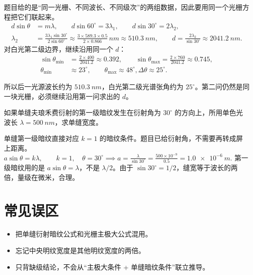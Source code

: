\documentclass[lang=cn,11pt]{elegantbook}
\begin{document}
\begin{solution}
题目给的是“同一光栅、不同波长、不同级次”的两组数据，因此要用同一个光栅方程把它们联起来。
\[
\begin{aligned}
d\sin\theta&=m\lambda,\qquad
d\sin60^\circ=3\lambda_1,\qquad
d\sin30^\circ=2\lambda_2,\\
\lambda_2&=\frac{3\lambda_1\sin30^\circ}{2\sin60^\circ}
\approx \frac{3\times589.3\times0.5}{2\times0.866}\,\si{nm}
\approx \SI{510.3}{nm},\qquad
d=\frac{2\lambda_2}{\sin30^\circ}\approx \SI{2041.2}{nm}.
\end{aligned}
\]
对白光第二级边界，继续沿用同一个 \(d\)：
\[
\begin{aligned}
\sin\theta_{\min}&=\frac{2\times400}{2041.2}\approx0.392,\qquad
\sin\theta_{\max}=\frac{2\times760}{2041.2}\approx0.745,\\
\theta_{\min}&\approx23^\circ,\qquad
\theta_{\max}\approx48^\circ,
\Delta\theta\approx25^\circ.
\end{aligned}
\]

所以后一光源波长约为 \(\SI{510.3}{nm}\)，白光第二级光谱张角约为 \(25^\circ\)。第二问仍然是同一块光栅，必须继续沿用第一问求出的 \(d\)。
\end{solution}

\begin{exercise}
如果单缝夫琅禾费衍射的第一级暗纹发生在衍射角为 \(30^\circ\) 的方向上，所用单色光波长 \(\lambda=\SI{500}{nm}\)，求单缝宽度。
\end{exercise}

\begin{solution}
单缝第一级暗纹直接对应 \(k=1\) 的暗纹条件。题目已给衍射角，不需要再转成屏上距离。
 \(a\sin\theta=k\lambda,\qquad k=1,\quad \theta=30^\circ \implies a=\frac{\lambda}{\sin30^\circ} =\frac{500\times10^{-9}}{0.5} =\SI{1.0e-6}{m}.\) 
第一级暗纹用的是 \(a\sin\theta=\lambda\)，不是 \(\lambda/2\)。由于 \(\sin30^\circ=1/2\)，缝宽等于波长的两倍，量级在微米，合理。
\end{solution}

\section{常见误区}

\begin{itemize}
 \item 把单缝衍射暗纹公式和光栅主极大公式混用。
 \item 忘记中央明纹宽度是其他明纹宽度的两倍。
 \item 只背缺级结论，不会从“主极大条件 + 单缝暗纹条件”联立推导。
\end{itemize}
\end{document}
